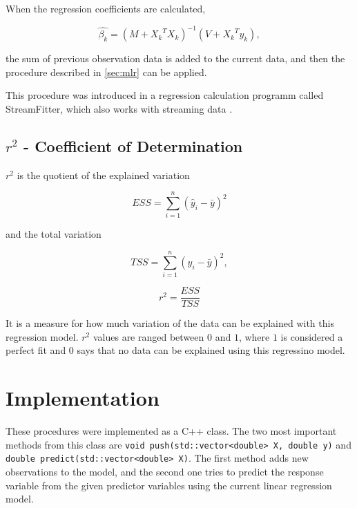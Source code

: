 When the regression coefficients are calculated,

\begin{equation}
    \hat{\beta_k} = (M + {X_k}^T X_k)^{-1}(V + {X_k}^T y_k),
\end{equation}

the sum of previous observation data is added to the current data, and then the procedure described in \vref{sec:mlr} can be applied.

This procedure was introduced in a regression calculation programm called StreamFitter, which also works with streaming data \autocite{StreamFitter}.

\subsection{$ r^2 $ - Coefficient of Determination}
\label{sec:rsquared}

$ r^2 $ is the quotient of the explained variation

\begin{equation}
    ESS = \sum_{i=1}^{n} (\hat{y}_i - \bar{y})^2
\end{equation}

and the total variation

\begin{equation}
    TSS = \sum_{i=1}^{n} (y_i - \bar{y})^2,
\end{equation}

\begin{equation}
    r^2 = \frac{ESS}{TSS}
\end{equation}

It is a measure for how much variation of the data can be explained with this regression model. $ r^2 $ values are ranged between $ 0 $ and $ 1 $, where $ 1 $ is considered a perfect fit and $ 0 $ says that no data can be explained using this regressino model.

\section{Implementation}

These procedures were implemented as a C++ class. The two most important methods from this class are \lstinline{void push(std::vector<double> X, double y)} and \lstinline{double predict(std::vector<double> X)}. The first method adds new observations to the model, and the second one tries to predict the response variable from the given predictor variables using the current linear regression model.


